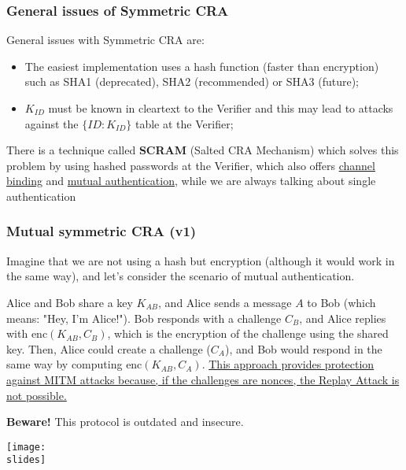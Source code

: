 \subsubsection{General issues of Symmetric CRA}
General issues with Symmetric CRA are:
\begin{itemize}
  \item The easiest implementation uses a hash function (faster than encryption) such as SHA1 (deprecated),
        SHA2 (recommended) or SHA3 (future);
  \item \(K_{ID}\) must be known in cleartext to the Verifier and this may lead to attacks against the \( \{ID: K_{ID}\} \) table at the Verifier;
\end{itemize}
There is a technique called \textbf{SCRAM} (Salted CRA Mechanism) which solves this problem by using hashed
passwords at the Verifier, which also offers \underline{channel binding} and \underline{mutual authentication}, while we are always talking about single authentication


\subsubsection{Mutual symmetric CRA (v1)}
\noindent
\begin{minipage}{0.4\textwidth}
  Imagine that we are not using a hash but encryption (although it would work in the same way), and let's consider the scenario of mutual authentication.

  Alice and Bob share a key \(K_{AB}\), and Alice sends a message \(A\) to Bob (which means: "Hey, I'm Alice!").
  Bob responds with a challenge \(C_B\),
  and Alice replies with \(\text{enc}(K_{AB}, C_B)\), which is the encryption of the challenge using the shared key.
  Then, Alice could create a challenge (\(C_A\)), and Bob would respond in the same way by computing \(\text{enc}(K_{AB}, C_A)\).
  \ul{This approach provides protection against MITM attacks because, if the challenges are nonces, the Replay Attack is not possible.}

  \textbf{Beware!} This protocol is outdated and insecure.
\end{minipage}
\hspace{0.05\textwidth}
\begin{minipage}{0.5\textwidth}
  \centering
  \texttt{[image: \\slides]}
\end{minipage}

